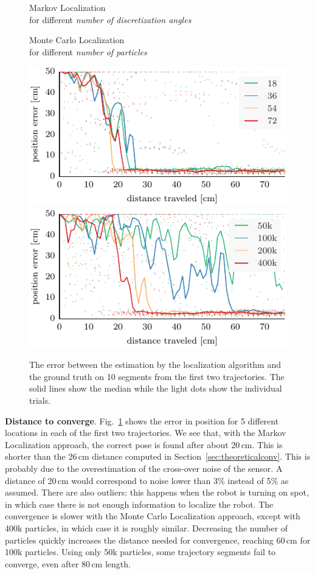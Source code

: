 \documentclass{svmult}
\newcommand{\Fig}[1]{Fig.~\ref{fig:#1}}
\newcommand{\sect}[1]{Section~\ref{sec:#1}}
\begin{document}
\begin{figure}

\begin{minipage}{.5\columnwidth}
\begin{center}
Markov Localization\\for different \emph{number of discretization angles}
\end{center}
\end{minipage}
\hfill
\begin{minipage}{.5\columnwidth}
\begin{center}
Monte Carlo Localization\\for different \emph{number of particles}
\end{center}
\end{minipage}

\includegraphics[width=.5\columnwidth]{ml-small_runs_random_12-xy}
\includegraphics[width=.5\columnwidth]{mcl-small_runs_random_12-xy}

\caption{%
The error between the estimation by the localization algorithm and the ground truth on 10 segments from the first two trajectories.
The solid lines show the median while the light dots show the individual trials.}
\label{fig:small-runs}
\end{figure}

\textbf{Distance to converge}.
\Fig{small-runs} shows the error in position for 5 different locations in each of the first two trajectories.
We see that, with the Markov Localization approach, the correct pose is found after about 20\,cm.
This is shorter than the 26\,cm distance computed in \sect{theoreticalconv}.
This is probably due to the overestimation of the cross-over noise of the sensor.
A distance of 20\,cm would correspond to noise lower than 3\% instead of 5\% as assumed.
There are also outliers: this happens when the robot is turning on spot, in which case there is not enough information to localize the robot.
The convergence is slower with the Monte Carlo Localization approach, except with 400k particles, in which case it is roughly similar.
Decreasing the number of particles quickly increases the distance needed for convergence, reaching 60\,cm for 100k particles.
Using only 50k particles, some trajectory segments fail to converge, even after 80\,cm length.
\end{document}
